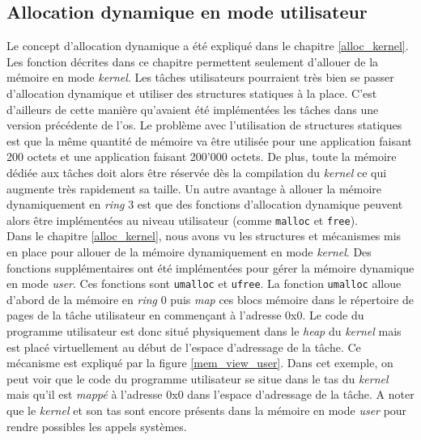
\subsection{Allocation dynamique en mode utilisateur}
\label{alloc_user}
Le concept d'allocation dynamique a été expliqué dans le chapitre \ref{alloc_kernel}.
Les fonction décrites dans ce chapitre permettent seulement d'allouer de la mémoire
en mode \textit{kernel}. Les tâches utilisateurs pourraient très bien se passer
d'allocation dynamique et utiliser des structures statiques à la place. C'est
d'ailleurs de cette manière qu'avaient été implémentées les tâches dans une version
précédente de l'\acrshort{os}. Le problème avec l'utilisation de structures
statiques est que la même quantité de mémoire va être utilisée pour une application
faisant 200 octets et une application faisant 200'000 octets. De plus, toute la
mémoire dédiée aux tâches doit alors être réservée dès la compilation du \textit{kernel}
ce qui augmente très rapidement sa taille. Un autre avantage à allouer la mémoire
dynamiquement en \textit{ring} 3 est que des fonctions d'allocation dynamique 
peuvent alors être implémentées au niveau utilisateur (comme \texttt{malloc}
et \texttt{free}). \\

Dans le chapitre \ref{alloc_kernel}, nous avons vu les structures et mécanismes
mis en place pour allouer de la mémoire dynamiquement en mode \textit{kernel}.
Des fonctions supplémentaires ont été implémentées pour gérer la mémoire dynamique en
mode \textit{user}. Ces fonctions sont \texttt{umalloc} et
\texttt{ufree}. La fonction \texttt{umalloc} alloue d'abord
de la mémoire en \textit{ring} 0 puis \textit{map} ces blocs mémoire
dans le répertoire de pages de la tâche utilisateur en commençant à l'adresse 0x0.
Le code du programme utilisateur est donc situé physiquement dans le \textit{heap}
du \textit{kernel} mais est placé virtuellement au début de l'espace d'adressage
de la tâche. Ce mécanisme est expliqué par la figure \ref{mem_view_user}.
Dans cet exemple, on peut voir que le code du programme utilisateur se situe
dans le tas du \textit{kernel} mais qu'il est \textit{mappé} à l'adresse 0x0
dans l'espace d'adressage de la tâche. A noter que le \textit{kernel} et son tas
sont encore présents dans la mémoire en mode \textit{user} pour rendre possibles
les appels systèmes.

